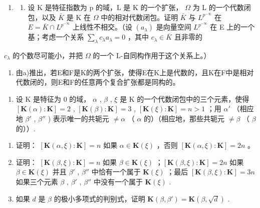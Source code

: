 \begin{enumerate}
\def\labelenumi{\arabic{enumi})}
\setcounter{enumi}{5}
\tightlist
\item
  \begin{enumerate}
  \def\labelenumii{\alph{enumii})}
  \tightlist
  \item
    设 K 是特征指数为 p 的域，L 是 K 的一个扩张， \(\Omega\) 为 L 的一个代数闭包，以及 \(\bar{K}\) 是 K 在 \(\Omega\) 中的相对代数闭包。证明 \(\bar{K}\) 与 \(L^{p^{-\infty}}\) 在 \(E = \bar{K} \cap L^{p^{-\infty}}\) 上线性不相交。（设 \((a_{\lambda})\) 是向量空间 \(L^{p^{-\infty}}\) 在 E 上的一个基；考虑一个关系 \(\sum_{\lambda} c_{\lambda} a_{\lambda} = 0\) ，其中 \(c_{\lambda} \in \bar{K}\) 且非零的
  \end{enumerate}
\end{enumerate}

\(c_{\lambda}\) 的个数尽可能小，并把 \(\Omega\) 的一个 L-自同构作用于这个关系上。）

\begin{enumerate}
\def\labelenumi{\alph{enumi})}
\setcounter{enumi}{1}
\tightlist
\item
  由a)推出，若E和F是K的两个扩张，使得E在K上是代数的，且K在F中是相对代数闭的，则E和F的任意两个复合扩张都是同构的。
\end{enumerate}

\begin{enumerate}
\def\labelenumi{\arabic{enumi})}
\setcounter{enumi}{6}
\tightlist
\item
  设 K 是特征为 0 的域， \(\alpha\) , \(\beta\) , \(\xi\) 是 K 的一个代数闭包中的三个元素，使得 \([\mathbf{K}(\alpha):\mathbf{K}] = 2\) , \([\mathbf{K}(\beta):\mathbf{K}] = 3\) , \([\mathbf{K}(\xi):\mathbf{K}] = n > 1\) ；用 \(\alpha'\) （相应地 \(\beta'\) , \(\beta''\) ) 表示唯一的共轭元 \(\neq \alpha\) （ \(\alpha\) 的）（相应地，那些共轭元 \(\neq \beta\) （ \(\beta\) 的））.
\end{enumerate}

\begin{enumerate}
\def\labelenumi{\alph{enumi})}
\item
  证明： \([\mathbf{K}(\alpha, \xi): \mathbf{K}] = n\) 如果 \(\alpha \in \mathbf{K}(\xi)\) ，否则 \([\mathbf{K}(\alpha, \xi): \mathbf{K}] = 2n\) 。
\item
  证明： \([\mathbf{K}(\beta,\xi):\mathbf{K}]=n\) 如果 \(\beta\in\mathbf{K}(\xi)\) ；\([\mathbf{K}(\beta,\xi):\mathbf{K}]=2n\) 如果 \(\beta\in\mathbf{K}(\xi)\) 并且 \(\beta'\) , \(\beta''\) 中恰有一个属于 \(\mathbf{K}(\xi)\) ；最后 \([\mathbf{K}(\beta,\xi):\mathbf{K}]=3n\) 如果三个元素 \(\beta\) , \(\beta'\) , \(\beta''\) 中没有一个属于 \(\mathbf{K}(\xi)\) .
\item
  如果 \(d\) 是 \(\beta\) 的极小多项式的判别式，证明 \(\mathbf{K}(\beta, \beta') = \mathbf{K}(\beta, \sqrt{d})\) .
\end{enumerate}

